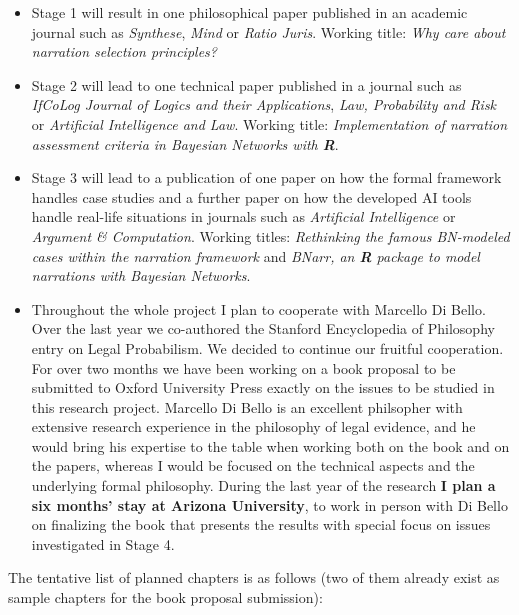 \documentclass[11pt,dvipsnames,enabledeprecatedfontcommands]{scrartcl}
\begin{document}
\begin{itemize}\setlength\itemsep{1mm}
\item \textsf{Stage 1} will result in  one philosophical paper published in an  academic journal such as \emph{Synthese}, \emph{Mind} or \emph{Ratio Juris}. Working title: \emph{Why care about narration selection principles?}

\item \textsf{Stage 2} will lead to one   technical paper  published in a journal such as \emph{IfCoLog Journal of Logics and their Applications}, \emph{Law, Probability and Risk} or \emph{Artificial Intelligence and Law}. Working title: \emph{Implementation of narration assessment criteria in Bayesian Networks with \textbf{\textsf{R}}}.

\item \textsf{Stage 3}  will lead to a publication of one paper  on  how the formal framework handles case studies and  a further paper  on how the developed AI tools handle real-life situations in   journals such as \emph{Artificial Intelligence} or \emph{Argument \& Computation}. Working titles: \emph{Rethinking the famous BN-modeled cases within the narration framework} and \emph{BNarr, an \textbf{\textsf{R}} package to model narrations with Bayesian Networks}.

\item Throughout the  whole project I plan to cooperate with Marcello Di Bello. Over the last year we co-authored the Stanford Encyclopedia of Philosophy entry on Legal Probabilism. We decided to continue our fruitful cooperation. For over two months we have been working on a book proposal to be submitted to Oxford University Press exactly on the issues to be studied in this research project. Marcello Di Bello is an excellent philsopher with extensive research experience in the philosophy of legal evidence, and he would bring his expertise to the table when working both on the book and on the papers, whereas I would be focused on the technical aspects and the underlying  formal philosophy. During the last year of the research \textbf{I plan a six months' stay at Arizona University}, to work in person with Di Bello on finalizing the book that presents the results with special focus on issues investigated in \textsf{Stage 4}.
\end{itemize}

\pagebreak 

The tentative list of planned chapters is as follows (two of them
already exist as sample chapters for the book proposal submission):
\end{document}
